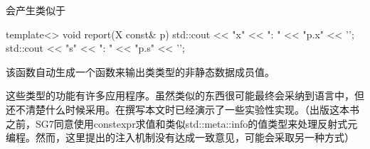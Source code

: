 会产生类似于

\begin{cpp}
template<> void report(X const& p) {
	std::cout << "x" << ": " << "p.x" << '\n';
	std::cout << "s" << ": " << "p.s" << '\n';
}
\end{cpp}

该函数自动生成一个函数来输出类类型的非静态数据成员值。

这些类型的功能有许多应用程序。虽然类似的东西很可能最终会采纳到语言中，但还不清楚什么时候采用。在撰写本文时已经演示了一些实验性实现。（出版这本书之前，SG7同意使用constexpr求值和类似std::meta::info的值类型来处理反射式元编程。然而，这里提出的注入机制没有达成一致意见，可能会采取另一种方式）

























